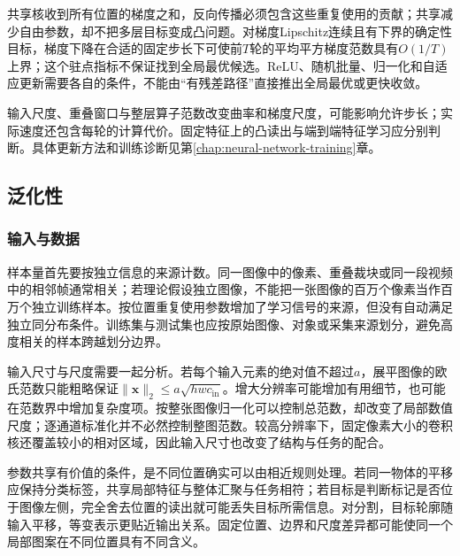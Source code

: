 共享核收到所有位置的梯度之和，反向传播必须包含这些重复使用的贡献；共享减少自由参数，却不把多层目标变成凸问题。对梯度Lipschitz连续且有下界的确定性目标，梯度下降在合适的固定步长下可使前$T$轮的平均平方梯度范数具有$O(1/T)$上界；这个驻点指标不保证找到全局最优候选。ReLU、随机批量、归一化和自适应更新需要各自的条件，不能由“有残差路径”直接推出全局最优或更快收敛。

输入尺度、重叠窗口与整层算子范数改变曲率和梯度尺度，可能影响允许步长；实际速度还包含每轮的计算代价。固定特征上的凸读出与端到端特征学习应分别判断。具体更新方法和训练诊断见第\ref{chap:neural-network-training}章。

\subsection{泛化性}
\label{sec:cnn-generalization}

\subsubsection{输入与数据}
\label{sec:cnn-data-generalization}

样本量首先要按独立信息的来源计数。同一图像中的像素、重叠裁块或同一段视频中的相邻帧通常相关；若理论假设独立图像，不能把一张图像的百万个像素当作百万个独立训练样本。按位置重复使用参数增加了学习信号的来源，但没有自动满足独立同分布条件。训练集与测试集也应按原始图像、对象或采集来源划分，避免高度相关的样本跨越划分边界。

输入尺寸与尺度需要一起分析。若每个输入元素的绝对值不超过$a$，展平图像的欧氏范数只能粗略保证$\lVert\bm x\rVert_2\leq a\sqrt{hwc_{\mathrm{in}}}$。增大分辨率可能增加有用细节，也可能在范数界中增加复杂度项。按整张图像归一化可以控制总范数，却改变了局部数值尺度；逐通道标准化并不必然控制整图范数。较高分辨率下，固定像素大小的卷积核还覆盖较小的相对区域，因此输入尺寸也改变了结构与任务的配合。

参数共享有价值的条件，是不同位置确实可以由相近规则处理。若同一物体的平移应保持分类标签，共享局部特征与整体汇聚与任务相符；若目标是判断标记是否位于图像左侧，完全舍去位置的读出就可能丢失目标所需信息。对分割，目标轮廓随输入平移，等变表示更贴近输出关系。固定位置、边界和尺度差异都可能使同一个局部图案在不同位置具有不同含义。

